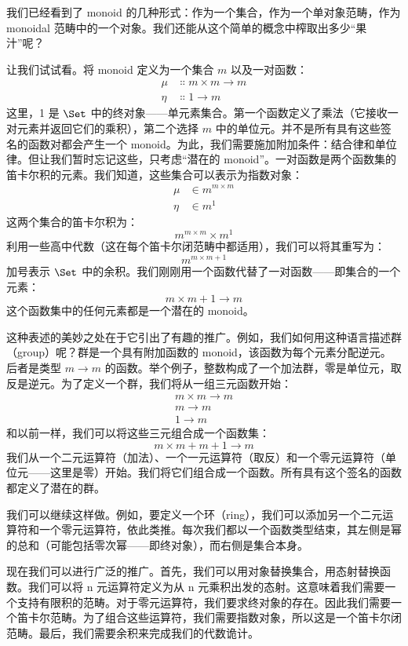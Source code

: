 
\lettrine[lhang=0.17]{我}{们已经看到了} monoid 的几种形式：作为一个集合，作为一个单对象范畴，作为 monoidal 范畴中的一个对象。我们还能从这个简单的概念中榨取出多少“果汁”呢？

让我们试试看。将 monoid 定义为一个集合 $m$ 以及一对函数：
\begin{align*}
  \mu  & \Colon m\times{}m \to m \\
  \eta & \Colon 1 \to m
\end{align*}
这里，1 是 $\Set$ 中的终对象——单元素集合。第一个函数定义了乘法（它接收一对元素并返回它们的乘积），第二个选择 $m$ 中的单位元。并不是所有具有这些签名的函数对都会产生一个 monoid。为此，我们需要施加附加条件：结合律和单位律。但让我们暂时忘记这些，只考虑“潜在的 monoid”。一对函数是两个函数集的笛卡尔积的元素。我们知道，这些集合可以表示为指数对象：
\begin{align*}
  \mu  & \in m^{m\times{}m} \\
  \eta & \in m^1
\end{align*}
这两个集合的笛卡尔积为：
\[m^{m\times{}m}\times{}m^1\]
利用一些高中代数（这在每个笛卡尔闭范畴中都适用），我们可以将其重写为：
\[m^{m\times{}m + 1}\]
加号表示 $\Set$ 中的余积。我们刚刚用一个函数代替了一对函数——即集合的一个元素：
\[m\times{}m + 1 \to m\]
这个函数集中的任何元素都是一个潜在的 monoid。

这种表述的美妙之处在于它引出了有趣的推广。例如，我们如何用这种语言描述群（group）呢？群是一个具有附加函数的 monoid，该函数为每个元素分配逆元。后者是类型 $m \to m$ 的函数。举个例子，整数构成了一个加法群，零是单位元，取反是逆元。为了定义一个群，我们将从一组三元函数开始：
\begin{align*}
  m\times{}m \to m \\
  m \to m          \\
  1 \to m
\end{align*}
和以前一样，我们可以将这些三元组合成一个函数集：
\[m\times{}m + m + 1 \to m\]
我们从一个二元运算符（加法）、一个一元运算符（取反）和一个零元运算符（单位元——这里是零）开始。我们将它们组合成一个函数。所有具有这个签名的函数都定义了潜在的群。

我们可以继续这样做。例如，要定义一个环（ring），我们可以添加另一个二元运算符和一个零元运算符，依此类推。每次我们都以一个函数类型结束，其左侧是幂的总和（可能包括零次幂——即终对象），而右侧是集合本身。

现在我们可以进行广泛的推广。首先，我们可以用对象替换集合，用态射替换函数。我们可以将 n 元运算符定义为从 n 元乘积出发的态射。这意味着我们需要一个支持有限积的范畴。对于零元运算符，我们要求终对象的存在。因此我们需要一个笛卡尔范畴。为了组合这些运算符，我们需要指数对象，所以这是一个笛卡尔闭范畴。最后，我们需要余积来完成我们的代数诡计。

